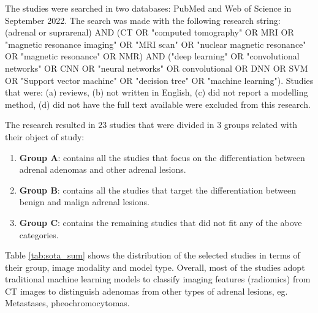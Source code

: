 \documentclass{article}
\begin{document}
The studies were searched in two databases: PubMed and Web of Science in
September 2022. The search was made with the following research string: (adrenal
or suprarenal) AND (CT OR "computed tomography" OR MRI OR "magnetic resonance
imaging" OR "MRI scan" OR "nuclear magnetic resonance" OR "magnetic resonance"
OR NMR) AND ("deep learning" OR "convolutional networks" OR CNN OR "neural
networks" OR convolutional OR DNN OR SVM OR "Support vector machine" OR
"decision tree" OR "machine learning"). Studies that were: (a) reviews, (b) not
written in English, (c) did not report a modelling method, (d) did not have the
full text available were excluded from this research.

The research resulted in 23 studies that were divided in 3 groups related with
their object of study:
\begin{enumerate}
    \item[] \textbf{Group A}: contains all the studies that focus on the
        differentiation between adrenal adenomas and other adrenal lesions.
    \item[] \textbf{Group B}: contains all the studies that target the
        differentiation between benign and malign adrenal lesions.
    \item[] \textbf{Group C}: contains the remaining studies that did not fit
        any of the above categories.
\end{enumerate}
Table \ref{tab:sota_sum} shows the distribution of the selected studies in terms
of their group, image modality and model type. Overall, most of the studies
adopt traditional machine learning models to classify imaging features
(radiomics) from CT images to distinguish adenomas from other types of adrenal
lesions, eg. Metastases, pheochromocytomas.
\end{document}

